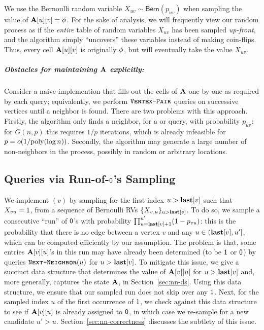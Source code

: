 We use the Bernoulli random variable $X_{uv} \sim \mathsf{Bern}(p_{uv})$ when sampling the value of $\mathbf{A}[u][v]=\phi$.
For the sake of analysis, we will frequently view our random process as if the \emph{entire} table of random variables $X_{uv}$ has been sampled
\emph{up-front}, and the algorithm simply ``uncovers'' these variables instead of making coin-flips.
Thus, every cell $\mathbf{A}[u][v]$ is originally $\phi$, but will eventually take the value $X_{uv}$.

\subparagraph*{Obstacles for maintaining $\mathbf{A}$ explicitly:}
Consider a naive implemention that fills out the cells of $\mathbf{A}$ one-by-one as required by each query;
equivalently, we perform $\texttt{\textsc{Vertex-Pair}}$ queries on successive vertices until a neighbor is found.
There are two problems with this approach.
Firstly, the algorithm only finds a neighbor, for a  or  query, with probability $p_{uv}$:
for $G(n,p)$ this requires $1/p$ iterations, which is already infeasible for $p = o(1/\mathrm{poly}(\log n))$.
Secondly, the algorithm may generate a large number of non-neighbors in the process, possibly in random or arbitrary locations.




\subsection{ Queries via Run-of-$\mathsf{0}$'s Sampling}\label{sec:ER-rand}

We implement $(v)$ by sampling for the first index $u > \mathbf{last}[v]$ such that $X_{vu}=\mathsf{1}$,
from a sequence of Bernoulli RVs $\{X_{v, u}\}_{u > \mathbf{last}[v]}$.
To do so, we sample a consecutive ``run'' of $\mathsf{0}$'s with probability $\prod_{u=\mathbf{last}[v]+1}^{u'} (1-p_{vu})$:
this is the probability that there is no edge between a vertex $v$ and any $u \in (\mathbf{last}[v],u']$, which can be computed efficiently by our assumption.
The problem is that, some entries $\mathbf{A}[v][u]$'s in this run may have already been determined (to be $\mathsf{1}$ or $\mathsf{0}$)
by queries $\texttt{\textsc{Next-Neighbor}}(u)$ for $u > \mathbf{last}[v]$.
To mitigate this issue, we give a succinct data structure that determines the value of $\mathbf{A}[v][u]$ for $u >\mathbf{last}[v]$ and,
more generally, captures the state $\mathbf{A}$, in Section~\ref{sec:nn-ds}.
Using this data structure, we ensure that our sampled run does not skip over any $\mathsf{1}$.
Next, for the sampled index $u$ of the first occurrence of $\mathsf{1}$,
we check against this data structure to see if $\mathbf{A}[v][u]$ is already assigned to $\mathsf{0}$, in which case we re-sample for a new candidate $u' > u$.
Section~\ref{sec:nn-correctness} discusses the subtlety of this issue.

